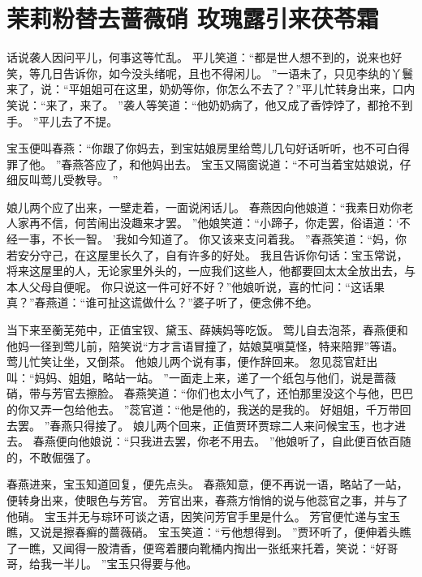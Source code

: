 \chapter{茉莉粉替去蔷薇硝 \quad 玫瑰露引来茯苓霜}
\par
话说袭人因问平儿，何事这等忙乱。
平儿笑道：“都是世人想不到的，说来也好笑，等几日告诉你，如今没头绪呢，且也不得闲儿。
”一语未了，只见李纨的丫鬟来了，说：“平姐姐可在这里，奶奶等你，你怎么不去了？”平儿忙转身出来，口内笑说：“来了，来了。
”袭人等笑道：“他奶奶病了，他又成了香饽饽了，都抢不到手。
”平儿去了不提。
\par
宝玉便叫春燕：“你跟了你妈去，到宝姑娘房里给莺儿几句好话听听，也不可白得罪了他。
”春燕答应了，和他妈出去。
宝玉又隔窗说道：“不可当着宝姑娘说，仔细反叫莺儿受教导。
”\par
娘儿两个应了出来，一壁走着，一面说闲话儿。
春燕因向他娘道：“我素日劝你老人家再不信，何苦闹出没趣来才罢。
”他娘笑道：“小蹄子，你走罢，俗语道：‘不经一事，不长一智。
’我如今知道了。
你又该来支问着我。
”春燕笑道：“妈，你若安分守己，在这屋里长久了，自有许多的好处。
我且告诉你句话：宝玉常说，将来这屋里的人，无论家里外头的，一应我们这些人，他都要回太太全放出去，与本人父母自便呢。
你只说这一件可好不好？”他娘听说，喜的忙问：“这话果真？”春燕道：“谁可扯这谎做什么？”婆子听了，便念佛不绝。
\par
当下来至蘅芜苑中，正值宝钗、黛玉、薛姨妈等吃饭。
莺儿自去泡茶，春燕便和他妈一径到莺儿前，陪笑说“方才言语冒撞了，姑娘莫嗔莫怪，特来陪罪”等语。
莺儿忙笑让坐，又倒茶。
他娘儿两个说有事，便作辞回来。
忽见蕊官赶出叫：“妈妈、姐姐，略站一站。
”一面走上来，递了一个纸包与他们，说是蔷薇硝，带与芳官去擦脸。
春燕笑道：“你们也太小气了，还怕那里没这个与他，巴巴的你又弄一包给他去。
”蕊官道：“他是他的，我送的是我的。
好姐姐，千万带回去罢。
”春燕只得接了。
娘儿两个回来，正值贾环贾琮二人来问候宝玉，也才进去。
春燕便向他娘说：“只我进去罢，你老不用去。
”他娘听了，自此便百依百随的，不敢倔强了。
\par
春燕进来，宝玉知道回复，便先点头。
春燕知意，便不再说一语，略站了一站，便转身出来，使眼色与芳官。
芳官出来，春燕方悄悄的说与他蕊官之事，并与了他硝。
宝玉并无与琮环可谈之语，因笑问芳官手里是什么。
芳官便忙递与宝玉瞧，又说是擦春癣的蔷薇硝。
宝玉笑道：“亏他想得到。
”贾环听了，便伸着头瞧了一瞧，又闻得一股清香，便弯着腰向靴桶内掏出一张纸来托着，笑说：“好哥哥，给我一半儿。
”宝玉只得要与他。
